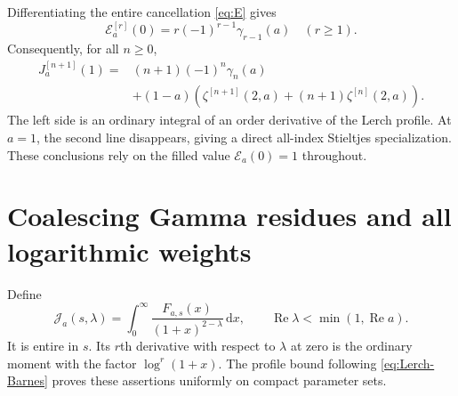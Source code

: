 \documentclass[11pt]{article}
\numberwithin{equation}{section}
\theoremstyle{definition}
\DeclareMathOperator{\Rea}{Re}
\newcommand{\dd}{\,\mathrm d}
\newcommand{\EE}{\mathcal E}
\newcommand{\JJ}{\mathcal J}
\begin{document}
Differentiating the entire cancellation \eqref{eq:E} gives
\[
 \EE_a^{[r]}(0)=r(-1)^{r-1}\gamma_{r-1}(a)\quad(r\ge1).
\]
Consequently, for all $n\ge0$,
\begin{equation}\label{eq:J-Stieltjes}
 \begin{split}
 J_a^{[n+1]}(1)={}&(n+1)(-1)^n\gamma_n(a)\\
 &+(1-a)\left(\zeta^{[n+1]}(2,a)+(n+1)\zeta^{[n]}(2,a)\right).
 \end{split}
\end{equation}
The left side is an ordinary integral of an order derivative of the Lerch profile. At $a=1$, the second line disappears, giving a direct all-index Stieltjes specialization. These conclusions rely on the filled value $\EE_a(0)=1$ throughout.

\section{Coalescing Gamma residues and all logarithmic weights}\label{sec:logmoments}
Define
\begin{equation}\label{eq:J-lambda}
 \JJ_a(s,\lambda)=\int_0^\infty
 \frac{F_{a,s}(x)}{(1+x)^{2-\lambda}}\dd x,
 \qquad \Rea\lambda<\min(1,\Rea a).
\end{equation}
It is entire in $s$. Its $r$th derivative with respect to $\lambda$ at zero is the ordinary moment with the factor $\log^r(1+x)$. The profile bound following \eqref{eq:Lerch-Barnes} proves these assertions uniformly on compact parameter sets.
\end{document}
